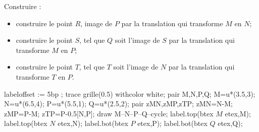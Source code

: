 \begin{exercice*}
    Construire :
    \begin{itemize}
        \item construire le point $R$, image de $P$ par la translation qui transforme $M$ en $N$;
        \item construire le point $S$, tel que $Q$ soit l'image de $S$ par la translation qui transforme $M$ en $P$;
        \item construire le point $T$, tel que $T$ soit l'image de $N$ par la translation qui transforme $T$ en $P$.
    \end{itemize}
    \medskip
    \begin{Geometrie}[CoinHD={(9u,5u)}]
        labeloffset := 5bp ;
        trace grille(0.5) withcolor white;
        pair M,N,P,Q;
        M=u*(3.5,3);
        N=u*(6.5,4);
        P=u*(5.5,1);
        Q=u*(2.5,2);
        pair zMN,zMP,zTP;
        zMN=N-M;
        zMP=P-M;
        zTP=P-0.5[N,P];
        draw M--N--P--Q--cycle;
        label.top(btex $M$ etex,M);
        label.top(btex $N$ etex,N);
        label.bot(btex $P$ etex,P);
        label.bot(btex $Q$ etex,Q);
    \end{Geometrie}
\end{exercice*}
